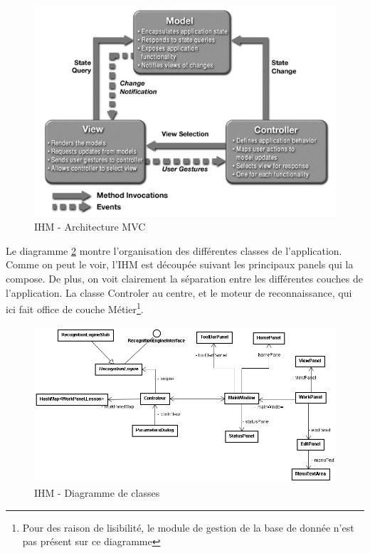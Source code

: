 \begin{figure}[h]
 \centering
 \includegraphics[scale=0.8]{./images/mvc.png}
 \caption{IHM - Architecture MVC }
 \label{fig:mvc}
\end{figure}


Le diagramme \ref{fig:ihmUMLl} montre l'organisation des différentes classes de l'application. Comme on peut le voir, l'IHM est découpée suivant les principaux panels qui la compose. De plus, on voit clairement la séparation entre les différentes couches de l'application. La classe Controler au centre, et le moteur de reconnaissance, qui ici fait office de couche Métier\footnote{Pour des raison de lisibilité, le module de gestion de la base de donnée n'est pas présent sur ce diagramme}.





\begin{figure}[h]
 \centering
 \includegraphics[scale=0.5]{./images/ihmUML.png}
 \caption{IHM - Diagramme de classes}
 \label{fig:ihmUMLl}
\end{figure}


